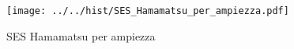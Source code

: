 \begin{figure}[h] \centering \texttt{[image: ../../hist/SES\_Hamamatsu\_per\_ampiezza.pdf]}\caption{SES Hamamatsu per ampiezza}\label{hist:SES_Hamamatsu_per_ampiezza} \end{figure}
